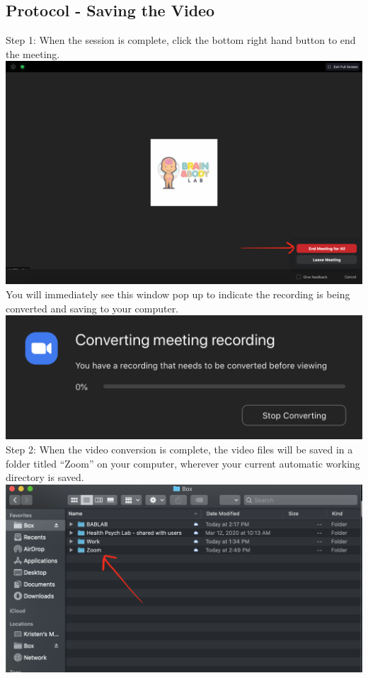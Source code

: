 \documentclass[]{book}
\begin{document}
\hypertarget{protocol---saving-the-video}{%
\subsection{Protocol - Saving the Video}\label{protocol---saving-the-video}}

Step 1:
When the session is complete, click the bottom right hand button to end the meeting. \includegraphics{images/zoom_parent_child_interaction/7.png} You will immediately see this window pop up to indicate the recording is being converted and saving to your computer. \includegraphics{images/zoom_parent_child_interaction/8.png}
Step 2:
When the video conversion is complete, the video files will be saved in a folder titled ``Zoom'' on your computer, wherever your current automatic working directory is saved. \includegraphics{images/zoom_parent_child_interaction/9.png}
\end{document}
